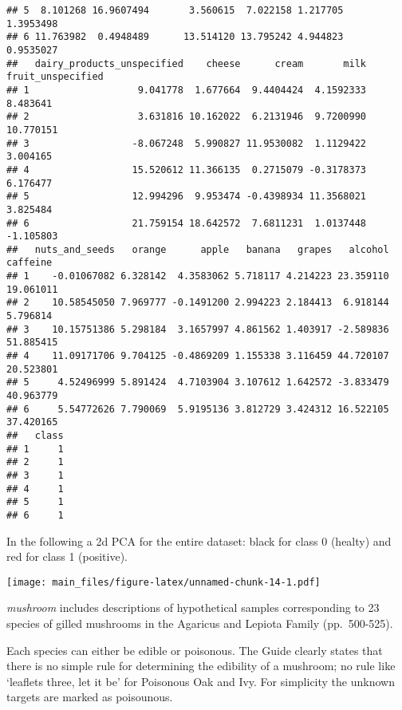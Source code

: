 \documentclass[
]{article}
\newenvironment{Shaded}{\begin{snugshade}}{\end{snugshade}}
\newcommand{\AttributeTok}[1]{\textcolor[rgb]{0.77,0.63,0.00}{#1}}
\newcommand{\DecValTok}[1]{\textcolor[rgb]{0.00,0.00,0.81}{#1}}
\newcommand{\FunctionTok}[1]{\textcolor[rgb]{0.00,0.00,0.00}{#1}}
\newcommand{\NormalTok}[1]{#1}
\newcommand{\OtherTok}[1]{\textcolor[rgb]{0.56,0.35,0.01}{#1}}
\newcommand{\SpecialCharTok}[1]{\textcolor[rgb]{0.00,0.00,0.00}{#1}}
\begin{document}
\begin{verbatim}
## 5  8.101268 16.9607494       3.560615  7.022158 1.217705      1.3953498
## 6 11.763982  0.4948489      13.514120 13.795242 4.944823      0.9535027
##   dairy_products_unspecified    cheese      cream       milk fruit_unspecified
## 1                   9.041778  1.677664  9.4404424  4.1592333          8.483641
## 2                   3.631816 10.162022  6.2131946  9.7200990         10.770151
## 3                  -8.067248  5.990827 11.9530082  1.1129422          3.004165
## 4                  15.520612 11.366135  0.2715079 -0.3178373          6.176477
## 5                  12.994296  9.953474 -0.4398934 11.3568021          3.825484
## 6                  21.759154 18.642572  7.6811231  1.0137448         -1.105803
##   nuts_and_seeds   orange      apple   banana   grapes   alcohol  caffeine
## 1    -0.01067082 6.328142  4.3583062 5.718117 4.214223 23.359110 19.061011
## 2    10.58545050 7.969777 -0.1491200 2.994223 2.184413  6.918144  5.796814
## 3    10.15751386 5.298184  3.1657997 4.861562 1.403917 -2.589836 51.885415
## 4    11.09171706 9.704125 -0.4869209 1.155338 3.116459 44.720107 20.523801
## 5     4.52496999 5.891424  4.7103904 3.107612 1.642572 -3.833479 40.963779
## 6     5.54772626 7.790069  5.9195136 3.812729 3.424312 16.522105 37.420165
##   class
## 1     1
## 2     1
## 3     1
## 4     1
## 5     1
## 6     1
\end{verbatim}

In the following a 2d PCA for the entire dataset: black for class 0
(healty) and red for class 1 (positive).

\begin{Shaded}
\end{Shaded}

\texttt{[image: main\_files/figure-latex/unnamed-chunk-14-1.pdf]}

\emph{mushroom} includes descriptions of hypothetical samples
corresponding to 23 species of gilled mushrooms in the Agaricus and
Lepiota Family (pp.~500-525).

Each species can either be edible or poisonous. The Guide clearly states
that there is no simple rule for determining the edibility of a
mushroom; no rule like `leaflets three, let it be' for Poisonous Oak and
Ivy. For simplicity the unknown targets are marked as poisounous.
\end{document}
